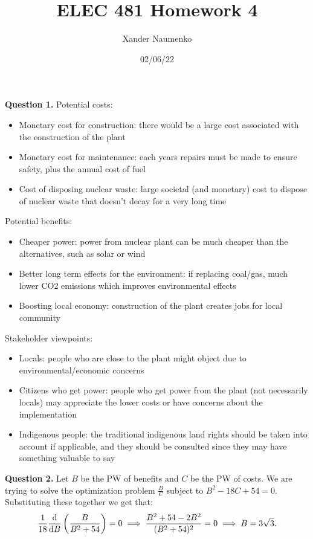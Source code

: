 \documentclass[letterpaper, reqno,11pt]{article}
\begin{document}
\title{ELEC 481 Homework 4}
\date{02/06/22}
\author{Xander Naumenko}
\maketitle

{\noindent\bf Question 1.} Potential costs: 
\begin{itemize}
    \item Monetary cost for construction: there would be a large cost associated with the construction of the plant
    \item Monetary cost for maintenance: each years repairs must be made to ensure safety, plus the annual cost of fuel
    \item Cost of disposing nuclear waste: large societal (and monetary) cost to dispose of nuclear waste that doesn't decay for a very long time
\end{itemize}

Potential benefits: 
\begin{itemize}
    \item Cheaper power: power from nuclear plant can be much cheaper than the alternatives, such as solar or wind
    \item Better long term effects for the environment: if replacing coal/gas, much lower CO2 emissions which improves environmental effects
    \item Boosting local economy: construction of the plant creates jobs for local community
\end{itemize}

Stakeholder viewpoints: 
\begin{itemize}
    \item Locals: people who are close to the plant might object due to environmental/economic concerns
    \item Citizens who get power: people who get power from the plant (not necessarily locals) may appreciate the lower costs or have concerns about the implementation
    \item Indigenous people: the traditional indigenous land rights should be taken into account if applicable, and they should be consulted since they may have something valuable to say
\end{itemize}

{\noindent\bf Question 2.} Let $B$ be the PW of benefits and $C$ be the PW of costs. We are trying to solve the optimization problem $\frac{B}{C}$ subject to $B^2-18C+54=0$. Substituting these together we get that: 
\[
\frac{1}{18}\frac{\text d}{\text dB} \left( \frac{B}{B^2+54} \right) =0\implies \frac{B^2+54-2B^2}{(B^2+54)^2}=0\implies B=3\sqrt{3} 
.\]
\end{document}
